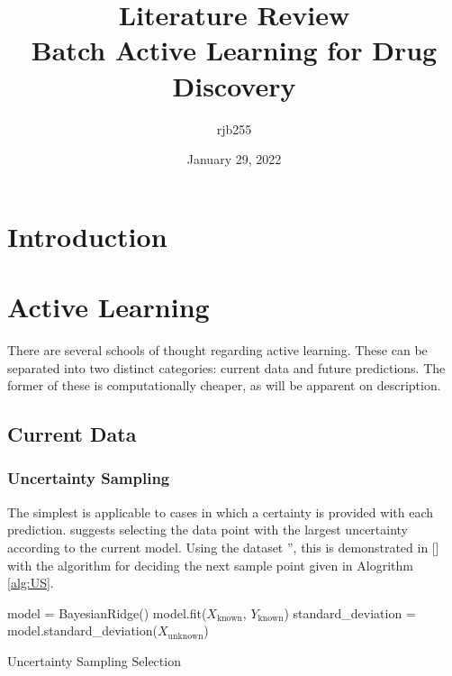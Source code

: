 \documentclass[a4paper, english]{report}
\begin{document}
\title{\Large{\textbf{Literature Review}}\\Batch Active Learning for Drug Discovery}
\author{rjb255}
\date{January 29, 2022}

\maketitle

\begin{abstract}
    \blindtext[1]{}
\end{abstract}

\section{Introduction}
\blindtext[2]{}

\section{Active Learning}\label{ch:Active Learning}
There are several schools of thought regarding active learning. These can be separated into two distinct categories: current data and future predictions. The former of these is computationally cheaper, as will be apparent on description.

\subsection{Current Data}
\subsubsection{Uncertainty Sampling}
The simplest is applicable to cases in which a certainty is provided with each prediction. \textcite{LitRev_2009} suggests selecting the data point with the largest uncertainty according to the current model. Using the dataset '', this is demonstrated in [] with the algorithm for deciding the next sample point given in Alogrithm \ref{alg:US}.
\begin{algorithm}[H]
    \label{alg:US}
    \SetAlgoLined

    model = BayesianRidge()\;
    model.fit($X_\mathrm{known}$, $Y_\mathrm{known}$)\;
    standard\_deviation = model.standard\_deviation($X_\mathrm{unknown}$)\;
    \caption{Uncertainty Sampling Selection}
\end{algorithm}
\end{document}
